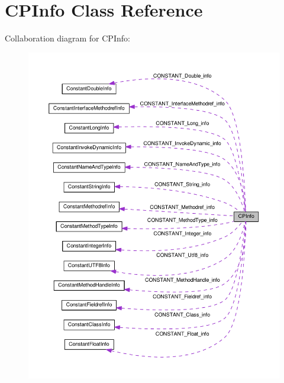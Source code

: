 \hypertarget{classCPInfo}{}\section{C\+P\+Info Class Reference}
\label{classCPInfo}


Collaboration diagram for C\+P\+Info\+:\nopagebreak
\begin{figure}[H]
\begin{center}
\leavevmode
\includegraphics[width=350pt]{classCPInfo__coll__graph}
\end{center}
\end{figure}
